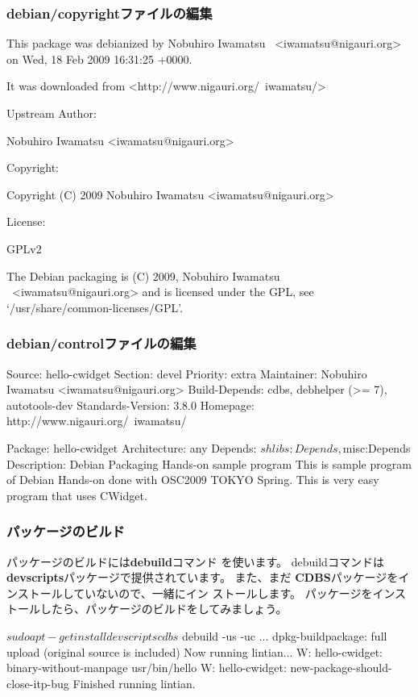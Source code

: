 \documentclass[mingoth,a4paper]{jsarticle}
\begin{document}
\subsubsection{debian/copyrightファイルの編集}
\begin{commandline}
This package was debianized by Nobuhiro Iwamatsu \ 
                                <iwamatsu@nigauri.org> on
Wed, 18 Feb 2009 16:31:25 +0000.

It was downloaded from <http://www.nigauri.org/~iwamatsu/>

Upstream Author:

    Nobuhiro Iwamatsu <iwamatsu@nigauri.org>

Copyright:

    Copyright (C) 2009 Nobuhiro Iwamatsu <iwamatsu@nigauri.org>

License:

    GPLv2

The Debian packaging is (C) 2009, Nobuhiro Iwamatsu \ 
        <iwamatsu@nigauri.org> and
is licensed under the GPL, see `/usr/share/common-licenses/GPL'.
\end{commandline}
\subsubsection{debian/controlファイルの編集}
\begin{commandline}
Source: hello-cwidget
Section: devel
Priority: extra
Maintainer: Nobuhiro Iwamatsu <iwamatsu@nigauri.org>
Build-Depends: cdbs, debhelper (>= 7), autotools-dev
Standards-Version: 3.8.0
Homepage: http://www.nigauri.org/~iwamatsu/

Package: hello-cwidget
Architecture: any
Depends: ${shlibs:Depends}, ${misc:Depends}
Description: Debian Packaging Hands-on sample program
 This is sample program of Debian Hands-on done with
 OSC2009 TOKYO Spring.
 This is very easy program that uses CWidget.
\end{commandline}

\subsubsection{パッケージのビルド}

パッケージのビルドには{\bf debuild}コマンド を使います。
debuildコマンドは{\bf devscripts}パッケージで提供されています。
また、まだ {\bf CDBS}パッケージをインストールしていないので、一緒にイン
ストールします。
パッケージをインストールしたら、パッケージのビルドをしてみましょう。
\begin{commandline}
$ sudo apt-get install devscripts cdbs
$ debuild -us -uc
...
dpkg-buildpackage: full upload (original source is included)
Now running lintian...
W: hello-cwidget: binary-without-manpage usr/bin/hello
W: hello-cwidget: new-package-should-close-itp-bug
Finished running lintian.
\end{commandline}
\end{document}
